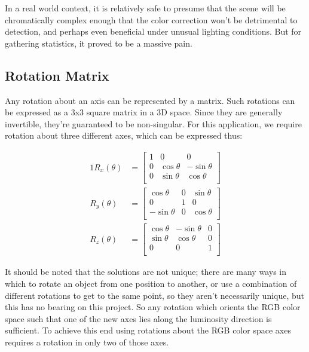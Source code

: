 In a real world context, it is relatively safe to presume that the scene will be chromatically complex enough that the color correction won't be detrimental to detection, and perhaps even beneficial under unusual lighting conditions. But for gathering statistics, it proved to be a massive pain.

\subsection{Rotation Matrix}\label{sec:RotationMatrix}

Any rotation about an axis can be represented by a matrix. Such rotations can be expressed as a 3x3 square matrix in a 3D space. Since they are generally invertible, they're guaranteed to be non-singular. For this application, we require rotation about three different axes, which can be expressed thus:


\begin{alignat}{1}
R_x(\theta) &= \begin{bmatrix}
1 & 0 & 0 \\
0 & \cos \theta &  -\sin \theta \\[3pt]
0 & \sin \theta  &  \cos \theta \\[3pt]
\end{bmatrix} \\[6pt]
R_y(\theta) &= \begin{bmatrix}
\cos \theta & 0 & \sin \theta \\[3pt]
0 & 1 & 0 \\[3pt]
-\sin \theta & 0 & \cos \theta \\
\end{bmatrix} \\[6pt]
R_z(\theta) &= \begin{bmatrix}
\cos \theta &  -\sin \theta & 0 \\[3pt]
\sin \theta & \cos \theta & 0\\[3pt]
0 & 0 & 1\\
\end{bmatrix}
\end{alignat}


It should be noted that the solutions are not unique; there are many ways in which to rotate an object from one position to another, or use a combination of different rotations to get to the same point, so they aren't necessarily unique, but this has no bearing on this project. So any rotation which orients the RGB color space such that one of the new axes lies along the luminosity direction is sufficient. To achieve this end using rotations about the RGB color space axes requires a rotation in only two of those axes.

